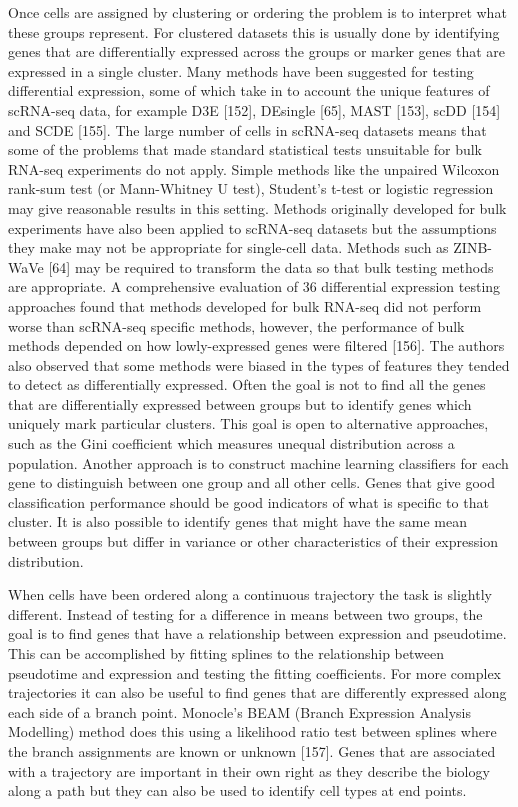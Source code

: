 \documentclass[11pt,a4paper,titlepage,twoside,openright]{style/unimelbthesis}
\theoremstyle{definition}
\theoremstyle{definition}
\theoremstyle{definition}
\theoremstyle{remark}
\begin{document}
\begin{mainmatter}
Once cells are assigned by clustering or ordering the problem is to interpret what these groups represent. For clustered datasets this is usually done by identifying genes that are differentially expressed across the groups or marker genes that are expressed in a single cluster. Many methods have been suggested for testing differential expression, some of which take in to account the unique features of scRNA-seq data, for example D3E {[}152{]}, DEsingle {[}65{]}, MAST {[}153{]}, scDD {[}154{]} and SCDE {[}155{]}. The large number of cells in scRNA-seq datasets means that some of the problems that made standard statistical tests unsuitable for bulk RNA-seq experiments do not apply. Simple methods like the unpaired Wilcoxon rank-sum test (or Mann-Whitney U test), Student's t-test or logistic regression may give reasonable results in this setting. Methods originally developed for bulk experiments have also been applied to scRNA-seq datasets but the assumptions they make may not be appropriate for single-cell data. Methods such as ZINB-WaVe {[}64{]} may be required to transform the data so that bulk testing methods are appropriate. A comprehensive evaluation of 36 differential expression testing approaches found that methods developed for bulk RNA-seq did not perform worse than scRNA-seq specific methods, however, the performance of bulk methods depended on how lowly-expressed genes were filtered {[}156{]}. The authors also observed that some methods were biased in the types of features they tended to detect as differentially expressed. Often the goal is not to find all the genes that are differentially expressed between groups but to identify genes which uniquely mark particular clusters. This goal is open to alternative approaches, such as the Gini coefficient which measures unequal distribution across a population. Another approach is to construct machine learning classifiers for each gene to distinguish between one group and all other cells. Genes that give good classification performance should be good indicators of what is specific to that cluster. It is also possible to identify genes that might have the same mean between groups but differ in variance or other characteristics of their expression distribution.

When cells have been ordered along a continuous trajectory the task is slightly different. Instead of testing for a difference in means between two groups, the goal is to find genes that have a relationship between expression and pseudotime. This can be accomplished by fitting splines to the relationship between pseudotime and expression and testing the fitting coefficients. For more complex trajectories it can also be useful to find genes that are differently expressed along each side of a branch point. Monocle's BEAM (Branch Expression Analysis Modelling) method does this using a likelihood ratio test between splines where the branch assignments are known or unknown {[}157{]}. Genes that are associated with a trajectory are important in their own right as they describe the biology along a path but they can also be used to identify cell types at end points.


\end{mainmatter}
\end{document}
